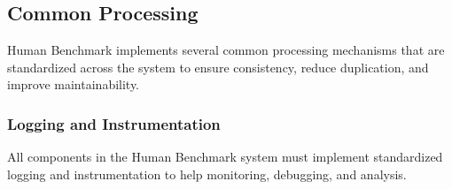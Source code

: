 \subsection{Common Processing}

Human Benchmark implements several common processing mechanisms that are standardized across the system to ensure consistency, reduce duplication, and improve maintainability.

\subsubsection{Logging and Instrumentation}

All components in the Human Benchmark system must implement standardized logging and instrumentation to help monitoring, debugging, and analysis.

